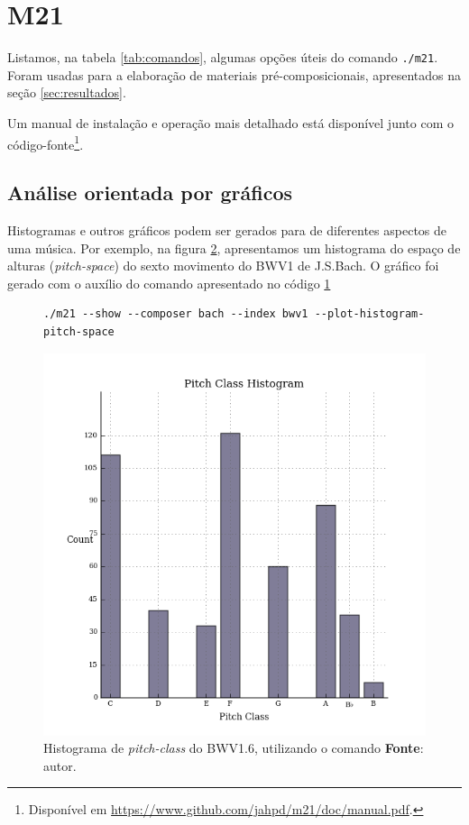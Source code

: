 \section{M21}\label{sec:m21}

 Listamos, na tabela \ref{tab:comandos}, algumas opções úteis do comando \verb|./m21|. Foram usadas para a elaboração de materiais pré-composicionais, apresentados na seção \ref{sec:resultados}. 

Um manual de instalação e operação mais detalhado está disponível junto com o código-fonte\footnote{Disponível em \url{https://www.github.com/jahpd/m21/doc/manual.pdf}.}.


 
\subsection{Análise orientada por gráficos}

Histogramas e outros gráficos podem ser gerados para de diferentes aspectos de uma música.  Por exemplo, na figura \ref{fig:pitch-space-bwv1-histogram}, apresentamos um histograma do espaço de alturas (\emph{pitch-space}) do sexto movimento do BWV1 de J.S.Bach. O gráfico foi gerado com o auxílio  do comando apresentado no código \ref{code:plot}

\begin{figure}
\begin{verbatim}
./m21 --show --composer bach --index bwv1 --plot-histogram-pitch-space
\end{verbatim}
\label{code:plot}
\end{figure}

\begin{figure}[h]
  \centering
  \includegraphics[scale=0.71]{../analysis/bwv1/pitch-class.png}
  \caption{Histograma de \emph{pitch-class} do BWV1.6, utilizando o comando \textbf{Fonte}: autor.}
    \label{fig:pitch-space-bwv1-histogram}
\end{figure}


